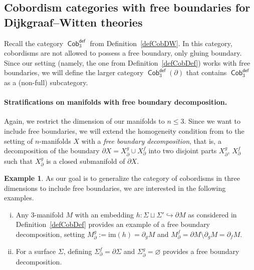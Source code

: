 \documentclass[pdftex]{sigma}
\DeclareMathOperator{\Cob}{\mathsf{Cob}}
\numberwithin{equation}{section}
\theoremstyle{definition}
\newtheorem{Example}[Example]{Example}
\begin{document}
\subsection{Cobordism categories with free boundaries for Dijkgraaf--Witten theories}
\label{subSecFB}
Recall the category $\Cob_3^{\mathsf{def}}$ from Definition~\ref{defCobDW}. In this category, cobordisms are not allowed to possess a free boundary, only gluing boundary. Since our setting (namely, the one from Definition~\ref{defCobDef}) works with free boundaries, we will define the larger category $\Cob_3^{\mathsf{def}}(\partial)$ that contains $\Cob_3^{\mathsf{def}}$ as a (non-full) subcategory.

\paragraph{Stratifications on manifolds with free boundary decomposition.} Again, we restrict the dimension of our manifolds to $n \leq 3$. Since we want to include free boundaries, we will extend the homogeneity condition from \cite[Definition~3.7]{FMM} to the setting of $n$-manifolds $X$ with a \textit{free boundary decomposition}, that is, a decomposition of the boundary $\partial X = X_{\partial}^g \cup X_{\partial}^f$ into two disjoint parts $X_{\partial}^g$, $X_{\partial}^f$ such that $X_{\partial}^g$ is a closed submanifold of $\partial X$.
\begin{Example} \label{exBound}
 As our goal is to generalize the category of cobordisms in three dimensions to include free boundaries, we are interested in the following examples.
 \begin{enumerate}[(i)]\itemsep=0pt
 \item \label{exFreeBoundCob} Any 3-manifold $M$ with an embedding $h\colon \Sigma \sqcup \Sigma' \hookrightarrow \partial M$ as considered in Definition~\ref{defCobDef} provides an example of a free boundary decomposition, setting $M_{\partial}^g := \mathrm{im}(h) = \partial_gM$ and $M_{\partial}^f = \partial M \setminus \partial _g M = \partial_fM$.
 \item \label{exFreeBoundSurf} For a surface $\Sigma$, defining $\Sigma_{\partial}^f = \partial \Sigma$ and $\Sigma_{\partial}^g = \varnothing$ provides a free boundary decomposition.
 \end{enumerate}
\end{Example}
\end{document}
